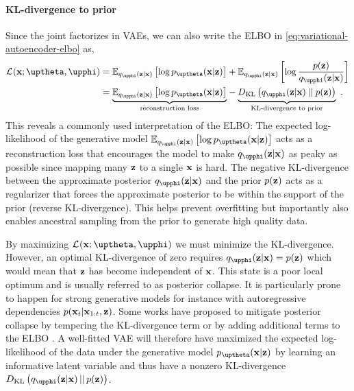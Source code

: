\paragraph{KL-divergence to prior}
Since the joint factorizes in VAEs, we can also write the ELBO in \cref{eq:variational-autoencoder-elbo} as,
%
\begin{align} \label{eq:variational-autoencoder-elbo-factorized}
    \mathcal{L}_{}(\xb;\thetab,\phib)
    &= \mathbb{E}_{q_\phib(\zb|\xb)}\left[\log p_\thetab(\xb|\zb)\right] + \mathbb{E}_{q_\phib(\zb|\xb)} \left[ \log \frac{p(\zb)}{q_\phib(\zb|\xb)}\right] \nonumber \\
    &= 
    \underset{\text{reconstruction loss}}{\underbrace{
        \mathbb{E}_{q_\phib(\zb|\xb)}\left[\log p_\thetab(\xb|\zb)\right]
    }}
     - 
    \underset{\text{KL-divergence to prior}}{
        \underbrace{\vphantom{\mathbb{E}_{q_\phib(\zb|\xb)}\left[\log p_\thetab(\xb|\zb)\right]}{D_\text{KL}\left( q_\phib(\zb|\xb) \parallel p(\zb) \right)}
    }} \enspace .
\end{align}
%
This reveals a commonly used interpretation of the ELBO: 
The expected log-likelihood of the generative model $\mathbb{E}_{q_\phib(\zb|\xb)}\left[\log p_\thetab(\xb|\zb)\right]$ acts as a reconstruction loss that encourages the model to make $q_\phib(\zb|\xb)$ as peaky as possible since mapping many ${\mathbf{z}}$ to a single ${\mathbf{x}}$ is hard. 
The negative KL-divergence between the approximate posterior $q_\phib(\zb|\xb)$ and the prior $p({\mathbf{z}})$ acts as a regularizer that forces the approximate posterior to be within the support of the prior (reverse KL-divergence). This helps prevent overfitting but importantly also enables ancestral sampling from the prior to generate high quality data. 

By maximizing $\mathcal{L}_{}(\xb;\thetab,\phib)$ we must minimize the KL-divergence. However, an optimal KL-divergence of zero requires $q_\phib(\zb|\xb) = p(\zb)$ which would mean that ${\mathbf{z}}$ has become independent of ${\mathbf{x}}$. 
This state is a poor local optimum and is usually referred to as posterior collapse. It is particularly prone to happen for strong generative models for instance with autoregressive dependencies $p({\mathbf{x}}_{t}|{\mathbf{x}}_{1:t},{\mathbf{z}})$. Some works have proposed to mitigate posterior collapse by tempering the KL-divergence term \parencite{alemi_fixing_2018,higgins_vvae_2017} or by adding additional terms to the ELBO \parencite{zhao_infovae_2018}. 
A well-fitted VAE will therefore have maximized the expected log-likelihood of the data under the generative model $p_\thetab(\xb|\zb)$ by learning an informative latent variable and thus have a nonzero KL-divergence $D_\text{KL}\left( q_\phib(\zb|\xb) \,||\, p(\zb) \right)$. 


